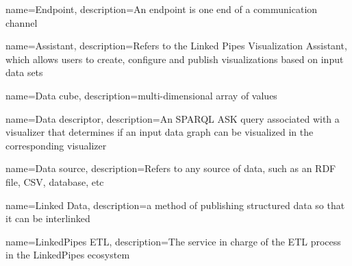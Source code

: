 
{
    name=Endpoint,
    description={An endpoint is one end of a communication channel}
}

{
    name=Assistant,
    description={Refers to the Linked Pipes Visualization Assistant, which allows users to create, configure and publish visualizations based on input data sets}
}

{
    name={Data cube},
    description={multi-dimensional array of values}
}

{
    name={Data descriptor},
    description={An SPARQL ASK query associated with a visualizer that determines if an input data graph can be visualized in the corresponding visualizer}
}

{
    name={Data source},
    description={Refers to any source of data, such as an RDF file, CSV, database, etc}
 }

{
    name={Linked Data},
    description={a method of publishing structured data so that it can be interlinked}
}


{
    name={LinkedPipes ETL},
    description={The service in charge of the ETL process in the LinkedPipes ecosystem}
}

